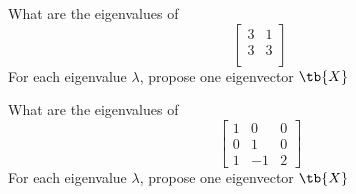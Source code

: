 \bexo
What are the eigenvalues of 
\begin{equation*}
\left[
\begin{array}{cc}
3 & 1\\
3 & 3\\
\end{array}
\right]
\end{equation*}
For each eigenvalue $\lambda$, propose one eigenvector $\tb{X}$
\eexo{}


\bexo
What are the eigenvalues of 
\begin{equation*}
\left[
\begin{array}{ccc}
1 & 0 & 0\\
0 & 1 & 0\\
1 & -1 & 2
\end{array}
\right]
\end{equation*}
For each eigenvalue $\lambda$, propose one eigenvector $\tb{X}$
\eexo{}

